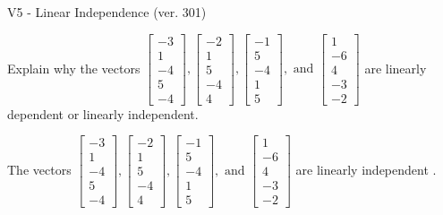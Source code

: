 \begin{exercise}
  \begin{exerciseTitle}V5 - Linear Independence (ver. 301)\end{exerciseTitle}
  \begin{exerciseStatement}
    Explain why the vectors \(\left[\begin{array}{r}
-3 \\
1 \\
-4 \\
5 \\
-4
\end{array}\right] , \left[\begin{array}{r}
-2 \\
1 \\
5 \\
-4 \\
4
\end{array}\right] , \left[\begin{array}{r}
-1 \\
5 \\
-4 \\
1 \\
5
\end{array}\right] , \text{ and } \left[\begin{array}{r}
1 \\
-6 \\
4 \\
-3 \\
-2
\end{array}\right]\) are linearly dependent or linearly independent.	


  \end{exerciseStatement}
  \begin{exerciseAnswer}
   The vectors \(\left[\begin{array}{r}
-3 \\
1 \\
-4 \\
5 \\
-4
\end{array}\right] , \left[\begin{array}{r}
-2 \\
1 \\
5 \\
-4 \\
4
\end{array}\right] , \left[\begin{array}{r}
-1 \\
5 \\
-4 \\
1 \\
5
\end{array}\right] , \text{ and } \left[\begin{array}{r}
1 \\
-6 \\
4 \\
-3 \\
-2
\end{array}\right]\) are 
  	 linearly independent  .
  


  \end{exerciseAnswer}
\end{exercise}